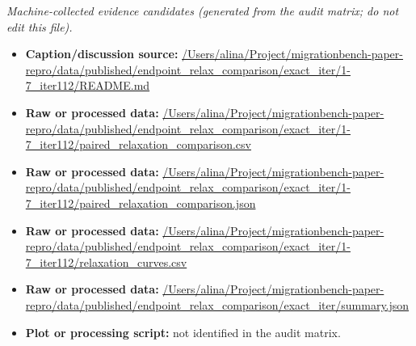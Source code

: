 \emph{Machine-collected evidence candidates (generated from the audit matrix; do not edit this file).}
\begin{itemize}[leftmargin=1.4em,noitemsep]
\item \textbf{Caption/discussion source:} \url{/Users/alina/Project/migrationbench-paper-repro/data/published/endpoint_relax_comparison/exact_iter/1-7_iter112/README.md}
\item \textbf{Raw or processed data:} \url{/Users/alina/Project/migrationbench-paper-repro/data/published/endpoint_relax_comparison/exact_iter/1-7_iter112/paired_relaxation_comparison.csv}
\item \textbf{Raw or processed data:} \url{/Users/alina/Project/migrationbench-paper-repro/data/published/endpoint_relax_comparison/exact_iter/1-7_iter112/paired_relaxation_comparison.json}
\item \textbf{Raw or processed data:} \url{/Users/alina/Project/migrationbench-paper-repro/data/published/endpoint_relax_comparison/exact_iter/1-7_iter112/relaxation_curves.csv}
\item \textbf{Raw or processed data:} \url{/Users/alina/Project/migrationbench-paper-repro/data/published/endpoint_relax_comparison/exact_iter/summary.json}
\item \textbf{Plot or processing script:} not identified in the audit matrix.
\end{itemize}
